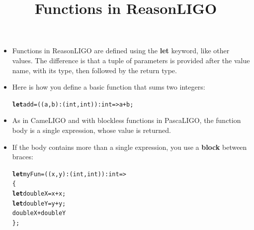 \documentclass[wide]{slides}
\newcommand{\Klet}[0]{\textbf{let}\xspace}
\begin{document}
\begin{slide}
  \title{Functions in ReasonLIGO}

  \begin{itemize}

    \item Functions in ReasonLIGO are defined using the \Klet keyword,
      like other values. The difference is that a tuple of parameters
      is provided after the value name, with its type, then followed
      by the return type.

    \item Here is how you define a basic function that sums two
      integers:
      \begin{alltt}
\Klet add = ((a, b): (int, int)) : int => a + b;
      \end{alltt}

      \item As in CameLIGO and with blockless functions in PascaLIGO,
        the function body is a single expression, whose value is
        returned.

      \item If the body contains more than a single expression, you
        use a \textbf{block} between braces:
        \begin{alltt}
\Klet myFun = ((x, y) : (int, int)) : int =>
\{
  \Klet doubleX = x + x;
  \Klet doubleY = y + y;
  doubleX + doubleY
\};
        \end{alltt}

  \end{itemize}

\end{slide}
\end{document}

